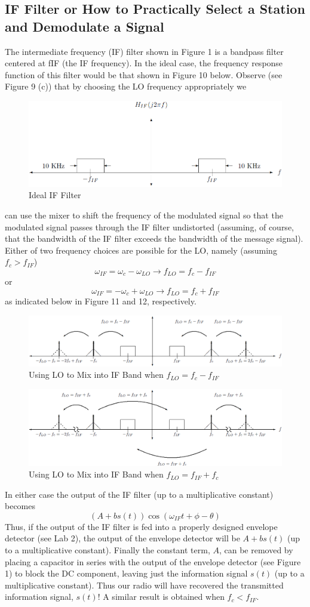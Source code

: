 \documentclass[a4paper]{article}
\begin{document}
\subsection{IF Filter or How to Practically Select a Station and Demodulate a Signal}
The intermediate frequency (IF) filter shown in Figure 1 is a bandpass filter centered at fIF (the IF frequency). In the ideal case, the frequency response function of this filter would be that shown in Figure 10 below. Observe (see Figure 9 (c)) that by choosing the LO frequency appropriately we
\begin{figure}[H]
	\centering
	\includegraphics[width=0.7\linewidth]{10.png}
	\caption{Ideal IF Filter}
\end{figure}
can use the mixer to shift the frequency of the modulated signal so that the modulated signal passes through the IF filter undistorted (assuming, of course, that the bandwidth of the IF filter exceeds the bandwidth of the message signal). Either of two frequency choices are possible for the LO, namely (assuming $f_c>f_{IF}$)
$$\omega_{IF}=\omega_c-\omega_{LO}\rightarrow f_{LO}=f_c-f_{IF}$$
or
$$\omega_{IF}=-\omega_c+\omega_{LO}\rightarrow f_{LO}=f_c+f_{IF}$$
as indicated below in Figure 11 and 12, respectively.
\begin{figure}[H]
	\centering
	\includegraphics[width=0.7\linewidth]{11.png}
	\caption{Using LO to Mix into IF Band when $f_{LO}=f_c-f_{IF}$}
\end{figure}
\begin{figure}[H]
	\centering
	\includegraphics[width=0.7\linewidth]{12.png}
	\caption{Using LO to Mix into IF Band when $f_{LO}=f_{IF}+f_c$}
\end{figure}
In either case the output of the IF filter (up to a multiplicative constant) becomes
$$(A+bs(t))\cos(\omega_{IF}t+\phi-\theta)$$
Thus, if the output of the IF filter is fed into a properly designed envelope detector (see Lab 2), the output of the envelope detector will be $A+bs(t)$ (up to a multiplicative constant). Finally the constant term, $A$, can be removed by placing a capacitor in series with the output of the envelope detector (see Figure 1) to block the DC component, leaving just the information signal $s(t)$ (up to a multiplicative constant). Thus our radio will have recovered the transmitted information signal, $s(t)$! A similar result is obtained when $f_c<f_{IF}$.
\end{document}
